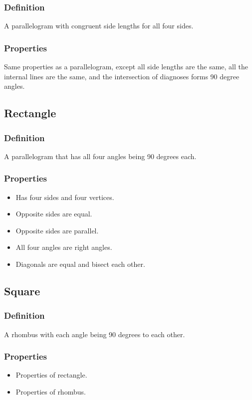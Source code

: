 \documentclass{article}
\begin{document}
\subsubsection{Definition}
A parallelogram with congruent side lengths for all four sides.
\subsubsection{Properties}
Same properties as a parallelogram, except all side lengths are the same, all the internal lines are the same, and the intersection of diagnoses forms 90 degree angles.
\subsection{Rectangle}
\subsubsection{Definition}
A parallelogram that has all four angles being 90 degrees each.
\subsubsection{Properties}
\begin{itemize}
    \item Has four sides and four vertices.
    \item Opposite sides are equal.
    \item Opposite sides are parallel.
    \item All four angles are right angles.
    \item Diagonals are equal and bisect each other.
\end{itemize}

\subsection{Square}
\subsubsection{Definition}
A rhombus with each angle being 90 degrees to each other.
\subsubsection{Properties}
\begin{itemize}
    \item Properties of rectangle.
    \item Properties of rhombus.

\end{itemize}
\pagebreak
\end{document}
